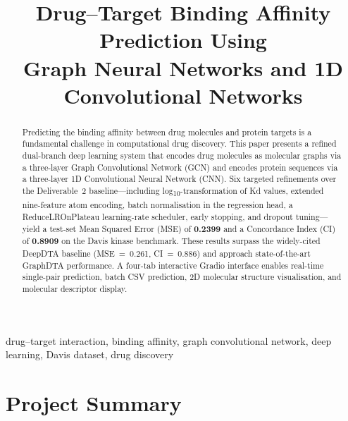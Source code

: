 \documentclass[conference]{IEEEtran}
\begin{document}
\title{Drug--Target Binding Affinity Prediction Using\\
Graph Neural Networks and 1D Convolutional Networks}

\author{
}

\maketitle

\begin{abstract}
Predicting the binding affinity between drug molecules and protein targets is a
fundamental challenge in computational drug discovery. This paper presents a
refined dual-branch deep learning system that encodes drug molecules as
molecular graphs via a three-layer Graph Convolutional Network (GCN) and
encodes protein sequences via a three-layer 1D Convolutional Neural Network
(CNN). Six targeted refinements over the Deliverable~2 baseline---including
log\textsubscript{10}-transformation of Kd values, extended nine-feature atom
encoding, batch normalisation in the regression head, a ReduceLROnPlateau
learning-rate scheduler, early stopping, and dropout tuning---yield a test-set
Mean Squared Error (MSE) of \textbf{0.2399} and a Concordance Index (CI) of
\textbf{0.8909} on the Davis kinase benchmark. These results surpass the
widely-cited DeepDTA baseline (MSE~=~0.261, CI~=~0.886) and approach
state-of-the-art GraphDTA performance. A four-tab interactive Gradio interface
enables real-time single-pair prediction, batch CSV prediction, 2D molecular
structure visualisation, and molecular descriptor display.
\end{abstract}

\begin{IEEEkeywords}
drug--target interaction, binding affinity, graph convolutional network,
deep learning, Davis dataset, drug discovery
\end{IEEEkeywords}

\section{Project Summary}
\end{document}
